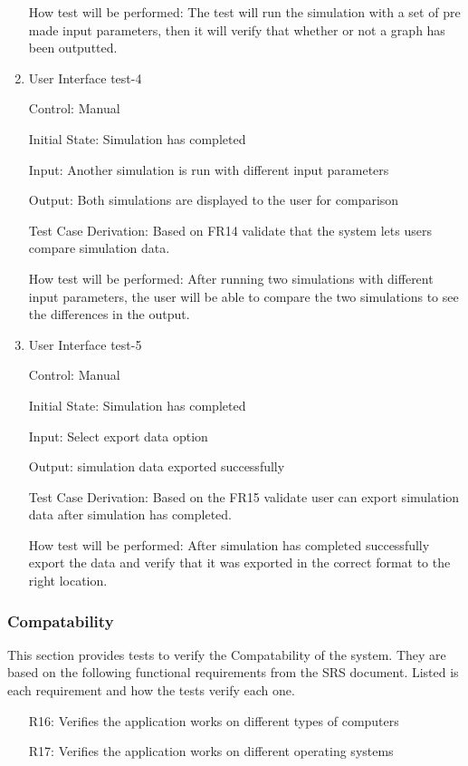 \documentclass[12pt, titlepage]{article}
\begin{document}
\begin{enumerate}
  How test will be performed: The test will run the simulation with a set of pre made input parameters, then it will verify that whether or not a graph has been outputted. 
  \item {User Interface test-4\\}
  
  Control: Manual
            
  Initial State: Simulation has completed
            
  Input: Another simulation is run with different input parameters
            
  Output: Both simulations are displayed to the user for comparison
  
  Test Case Derivation: Based on FR14 validate that the system lets users compare simulation data.
  
  How test will be performed: After running two simulations with different input parameters, the user will be able to compare the two simulations to see the differences in the output.
  \item {User Interface test-5\\}
  
  Control: Manual
            
  Initial State: Simulation has completed
            
  Input: Select export data option
            
  Output: simulation data exported successfully
  
  Test Case Derivation: Based on the FR15 validate user can export simulation data after simulation has completed.
  
  How test will be performed: After simulation has completed successfully export the data and verify that it was exported in the correct format to the right location.

\end{enumerate}

  \subsubsection{Compatability}

  This section provides tests to verify the Compatability of the system.
They are based on the following functional requirements from the SRS document.
Listed is each requirement and how the tests verify each one.
\begin{itemize}
  \item [R16:] Verifies the application works on different types of computers
  \item [R17:] Verifies the application works on different operating systems
\end{itemize}
\end{document}
